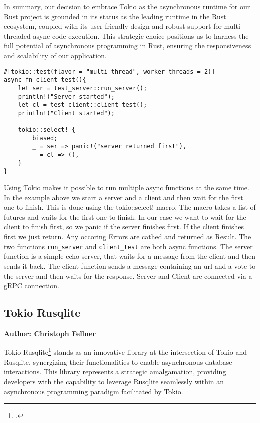 In summary, our decision to embrace Tokio as the asynchronous runtime for our Rust project is grounded in its status as the leading runtime in the Rust 
ecosystem, coupled with its user-friendly design and robust support for multi-threaded async code execution. This strategic choice positions us to harness the 
full potential of asynchronous programming in Rust, ensuring the responsiveness and scalability of our application.

\begin{verbatim}
#[tokio::test(flavor = "multi_thread", worker_threads = 2)]
async fn client_test(){ 
    let ser = test_server::run_server();
    println!("Server started");
    let cl = test_client::client_test();
    println!("Client started");

    tokio::select! {
        biased; 
        _ = ser => panic!("server returned first"),
        _ = cl => (),
    }           
}
\end{verbatim}

Using Tokio makes it possible to run multiple async functions at the same time. In the example above we start a server and a client and then wait for the first one to finish. 
This is done using the tokio::select! macro. The macro takes a list of futures and waits for the first one to finish. In our case we want to wait for the client to finish 
first, so we panic if the server finishes first. If the client finishes first we just return. Any occoring Errors are cathed and returned as Result.
The two functions \verb+run_server+ and \verb+client_test+ are both async functions. The server function is a simple echo server, that waits for a message from the client and 
then sends it back. The client function sends a message containing an url and a vote to the server and then waits for the response. Server and Client are connected via a gRPC 
connection. 

\subsection{Tokio Rusqlite}
\textbf{Author: Christoph Fellner}

Tokio Rusqlite\footcite{tokiolite} stands as an innovative library at the intersection of Tokio and Rusqlite, synergizing their functionalities to enable 
asynchronous database interactions. This library represents a strategic amalgamation, providing developers with the capability to leverage Rusqlite seamlessly 
within an asynchronous programming paradigm facilitated by Tokio.\newline

